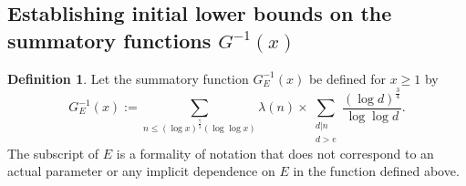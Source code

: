 \documentclass[11pt,reqno,a4letter]{article}
\numberwithin{figure}{section}
\numberwithin{table}{section}
\theoremstyle{plain}
\numberwithin{theorem}{section}
\theoremstyle{definition}
\newtheorem{definition}[theorem]{Definition}
\begin{document}
\subsection{Establishing initial lower bounds on the summatory functions $G^{-1}(x)$} 
\label{Section_ProofOfValidityOfAverageOrderLowerBounds} 

\begin{definition} 
Let the summatory function $G_E^{-1}(x)$ be defined for $x \geq 1$ by 
\begin{equation} 
\label{eqn_GEInvxSummatoryFuncDef_v1} 
G_E^{-1}(x) := \sum_{n \leq (\log x)^{\frac{7}{3}} (\log\log x)} \lambda(n) \times 
     \sum_{\substack{d|n \\ d > e}} \frac{(\log d)^{\frac{3}{4}}}{\log\log d}. 
\end{equation} 
The subscript of $E$ is a formality of 
notation that does not correspond to an actual parameter or any 
implicit dependence on $E$ in the function defined above. 
\end{definition} 
\end{document}
